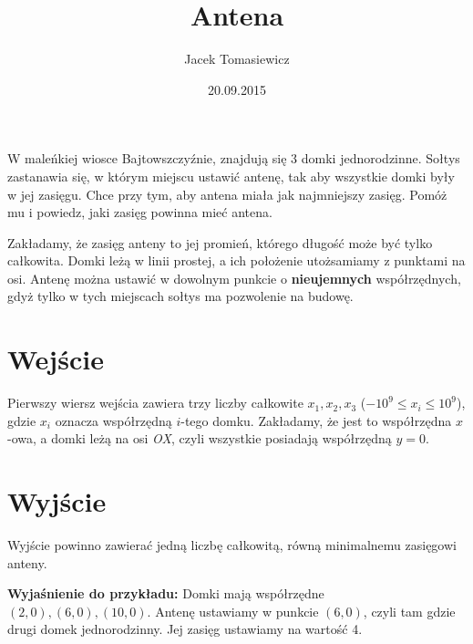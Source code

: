 \documentclass[zad,zawodnik,utf8]{sinol}
\title{Antena}
\author{Jacek Tomasiewicz}
\date{20.09.2015}
\begin{document}
  \begin{tasktext}%
W maleńkiej wiosce Bajtowszczyźnie, znajdują się 3 domki jednorodzinne. Sołtys zastanawia się, w którym miejscu ustawić antenę, tak aby wszystkie domki były w jej zasięgu. Chce przy tym, aby antena miała jak najmniejszy zasięg. Pomóż mu i powiedz, jaki zasięg powinna mieć antena.

Zakładamy, że zasięg anteny to jej promień, którego długość może być tylko całkowita. Domki leżą w linii prostej, a ich położenie utożsamiamy z punktami na osi. Antenę można ustawić w dowolnym punkcie o \textbf{nieujemnych} współrzędnych, gdyż tylko w tych miejscach sołtys ma pozwolenie na budowę.

  \section{Wejście}
Pierwszy wiersz wejścia zawiera trzy liczby całkowite $x_1, x_2, x_3$ ($-10^9 \leq x_i \leq 10^9$), gdzie $x_i$ oznacza współrzędną $i$-tego domku. Zakładamy, że jest to współrzędna $x$-owa, a domki leżą na osi \textit{OX}, czyli wszystkie posiadają współrzędną $y = 0$.

  \section{Wyjście}
Wyjście powinno zawierać jedną liczbę całkowitą, równą minimalnemu zasięgowi anteny.

     \makecompactexample

  \medskip
  \noindent
  \textbf{Wyjaśnienie do przykładu:} 
Domki mają współrzędne $(2, 0), (6, 0), (10, 0)$. Antenę ustawiamy w punkcie $(6,0)$, czyli tam gdzie drugi domek jednorodzinny. Jej zasięg ustawiamy na wartość 4.

  \end{tasktext}
\end{document}
